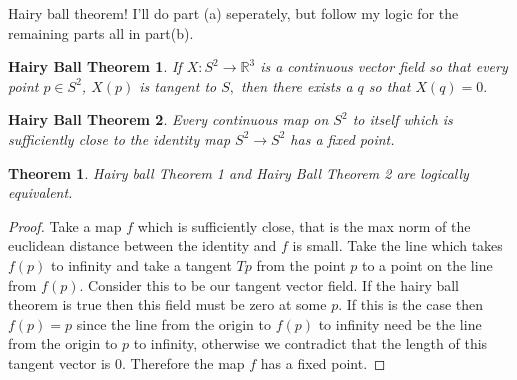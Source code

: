 \documentclass[letter]{article}
\newtheorem{theorem}{Theorem}
\newtheorem{hairy}{Hairy Ball Theorem}
\newenvironment{menumerate}{%
  \edef\backupindent{\the\parindent}%
  \enumerate%
  \setlength{\parindent}{\backupindent}%
}{\endenumerate}
\begin{document}
\begin{menumerate}
	\setcounter{enumi}{70}
	\item Hairy ball theorem! I'll do part (a) seperately, but follow my logic for the remaining parts all in part(b).
	\begin{menumerate}
		\item 
		\begin{hairy}
 			If $X: S^2 \to \mathbb{R}^3$ is a continuous vector field so that every point $p\in S^2$, $X(p)$
 			is tangent to $S,$ then there exists a $q$ so that $X(q) = 0.$
 		\end{hairy}
 		\begin{hairy}
 				Every continuous map on $S^2$ to itself which is sufficiently close to the identity map $S^2\to S^2$ has a fixed point.	
 		\end{hairy}
 		\begin{theorem}
 			Hairy ball Theorem 1 and Hairy Ball Theorem 2 are logically equivalent.
 		\end{theorem}
 		\begin{proof}
 			Take a map $f$ which is sufficiently close, that is 
    the max norm of the euclidean distance between the identity and $f$ is small.
    Take the line which takes $f(p)$ to infinity and take a tangent $Tp$ from the point $p$
    to a point on the line from $f(p).$ Consider this to be our tangent vector field. 
    If the hairy ball theorem is true then this field must be zero at some $p$. If this is the case
    then $f(p) = p$ since the line from the origin to $f(p)$ to infinity need be the line from 
    the origin to $p$ to infinity, otherwise we contradict that the length of this tangent vector is $0.$
	Therefore the map $f$ has a fixed point.


\end{proof}
\end{menumerate}
\end{menumerate}
\end{document}
